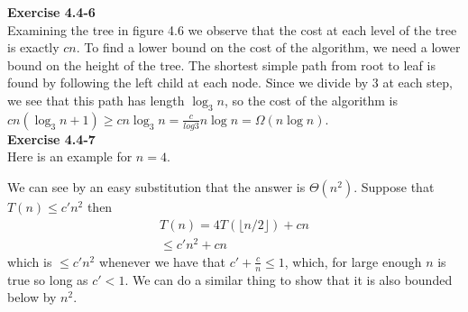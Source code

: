 \documentclass{article}
\begin{document}
\noindent\textbf{Exercise 4.4-6}\\

Examining the tree in figure 4.6 we observe that the cost at each level of the tree is exactly $cn$.  To find a lower bound on the cost of the algorithm, we need a lower bound on the height of the tree.  The shortest simple path from root to leaf is found by following the left child at each node.  Since we divide by 3 at each step, we see that this path has length $\log_3 n$, so the cost of the algorithm is $cn(\log_3 n + 1) \geq cn\log_3 n = \frac{c}{log 3} n \log n = \Omega(n \log n)$. \\

\noindent\textbf{Exercise 4.4-7}\\

Here is an example for $n=4$.



We can see by an easy substitution that the answer is $\Theta(n^2)$. Suppose that $T(n) \le c' n^2$ then
\begin{align*}
T(n) = 4T(\lfloor n/2\rfloor) + cn\\
\le c' n^2 + cn
\end{align*}
which is $\le c'n^2$ whenever we have that $c' + \frac{c}{n} \le 1$, which, for large enough $n$ is true so long as $c' <1$. We can do a similar thing to show that it is also bounded below by $n^2$.\\
\end{document}
